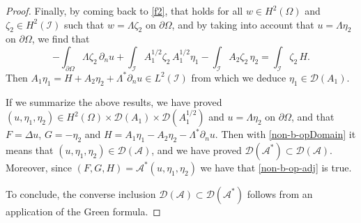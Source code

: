\documentclass[10pt,a4paper]{amsart}
\begin{document}
\begin{proof}
Finally, by coming back to \eqref{f2}, that holds for all $w\in H^2(\Omega)$ and $\zeta_2\in H^2(\mathcal{I})$ such that $w=\Lambda \zeta_2$ on $\partial\Omega$, and by taking into account that $u=\Lambda\eta_2$ on $\partial\Omega$, we find that 
$$
-\int_{\partial\Omega} \Lambda \zeta_2\,\partial_n u+\int_{\mathcal{I}} A_1^{1/2} \zeta_2 \, A_1^{1/2}\eta_1-\int_{\mathcal{I}}A_2\zeta_2\,\eta_2=\int_{\mathcal{I}}\zeta_2\,H
.$$
Then $A_1 \eta_1=H+A_2\eta_2 +\Lambda^*\partial_n u\in L^2(\mathcal{I})$ from which we deduce $\eta_1\in \mathcal{D}(A_1)$. 

If we summarize the above results, we have proved $(u,\eta_1,\eta_2)\in H^2(\Omega)\times \mathcal{D}(A_1)\times \mathcal{D}(A_1^{1/2})$ and $u=\Lambda\eta_2$ on $\partial\Omega$, and that $F=\Delta u$, $G=-\eta_2$ and $H=A_1 \eta_1-A_2\eta_2 -\Lambda^*\partial_n u$. Then with  \eqref{non-b-opDomain} it means that $(u,\eta_1,\eta_2)\in \mathcal{D}(\mathcal{A})$, and we have proved $\mathcal{D}(\mathcal{A}^*)\subset \mathcal{D}(\mathcal{A})$. Moreover, since $(F,G,H)=\mathcal{A^*}(u,\eta_1,\eta_2)$ we have that \eqref{non-b-op-adj} is true. 

To conclude,  the converse inclusion $\mathcal{D}(\mathcal{A})\subset \mathcal{D}(\mathcal{A}^*)$ follows from an application of the Green formula. 
\end{proof}
\end{document}

